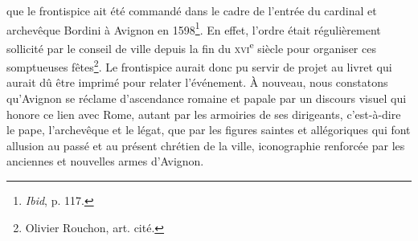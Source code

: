 \documentclass[12pt,twoside,openany]{book}
\begin{document}
que le frontispice ait été commandé dans le cadre de l’entrée du cardinal et archevêque Bordini à Avignon en 1598\footnote{\textit{Ibid}, p. 117.}. En effet, l’ordre était régulièrement sollicité par le conseil de ville depuis la fin du \textsc{xvi}\textsuperscript{e} siècle pour organiser ces somptueuses fêtes\footnote{Olivier Rouchon, art. cité.}. Le frontispice aurait donc pu servir de projet au livret qui aurait dû être imprimé pour relater l’événement. À nouveau, nous constatons qu’Avignon se réclame d’ascendance romaine et papale par un discours visuel qui honore ce lien avec Rome, autant par les armoiries de ses dirigeants, c’est-à-dire le pape, l’archevêque et le légat, que par les figures saintes et allégoriques qui font allusion au passé et au présent chrétien de la ville, iconographie renforcée par les anciennes et nouvelles armes d’Avignon.
\end{document}
